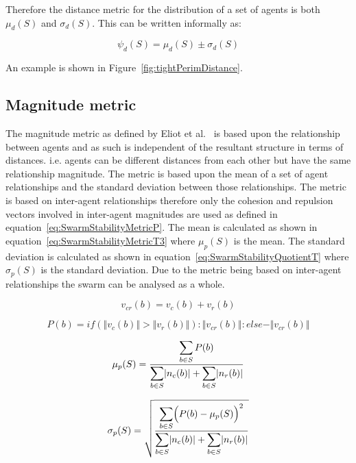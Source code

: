 \documentclass[12pt,a4paper]{IEEEtran}
\newcommand{\magn}[1]{\Vert{#1}\Vert}
\newcommand{\card}[1]{\vert{#1}\vert}
\begin{document}
Therefore the distance metric for the distribution of a set of agents is both $\mu_d(S)$ and $\sigma_d(S)$. This can be written informally as:

\small
\begin{equation}
\label{eq:SwarmPotentialMagnitude}
\psi_d(S) = \mu_d(S)\pm \sigma_d(S)
\end{equation}
\normalsize

An example is shown in Figure~\ref{fig:tightPerimDistance}.

\subsection{Magnitude metric}
The magnitude metric as defined by Eliot et al.~\cite{eliot2018metric} is based upon the relationship between agents and as such is independent of the resultant structure in terms of distances. i.e. agents can be different distances from each other but have the same relationship magnitude.
The metric is based upon the mean of a set of agent relationships and the standard deviation between those relationships. The metric is based on inter-agent relationships therefore only the cohesion and repulsion vectors involved in inter-agent magnitudes are used as defined in equation~\ref{eq:SwarmStabilityMetricP}. The mean is calculated as shown in equation~\ref{eq:SwarmStabilityMetricT3} where $\mu_p(S)$ is the mean. The standard deviation is calculated as shown in equation~\ref{eq:SwarmStabilityQuotientT} where $\sigma_p(S)$ is the standard deviation. Due to the metric being based on inter-agent relationships the swarm can be analysed as a whole.

\small
\begin{equation}\label{eq:SwarmStabilityMetricP1}
	v_{cr}(b) = v_{c}(b) + v_{r}(b)
\end{equation}

\begin{equation}\label{eq:SwarmStabilityMetricP}
	P(b) = if (\magn{v_{c}(b)} > \magn{v_{r}(b)}) : \magn{v_{cr}(b)}: else -\magn{v_{cr}(b)}
\end{equation}

\begin{equation}\label{eq:SwarmStabilityMetricT3}
	\mu_p(S) = \frac{\mathlarger{\sum_{b \in S} P(b)}}{\mathlarger{\sum_{b \in S}}\card{n_c(b)} + \mathlarger{\sum_{b \in S}}\card{n_r(b)}}
\end{equation}

\begin{equation}\label{eq:SwarmStabilityQuotientT}
	\sigma_p(S) = \sqrt{\frac{\mathlarger{\sum_{b \in S}}\Big(P(b)-\mu_p(S)\Big)^2}{\mathlarger{\sum_{b \in S}}\card{n_c(b)} + \mathlarger{\sum_{b \in S}}\card{n_r(b)}}}
\end{equation}
\normalsize
\end{document}
